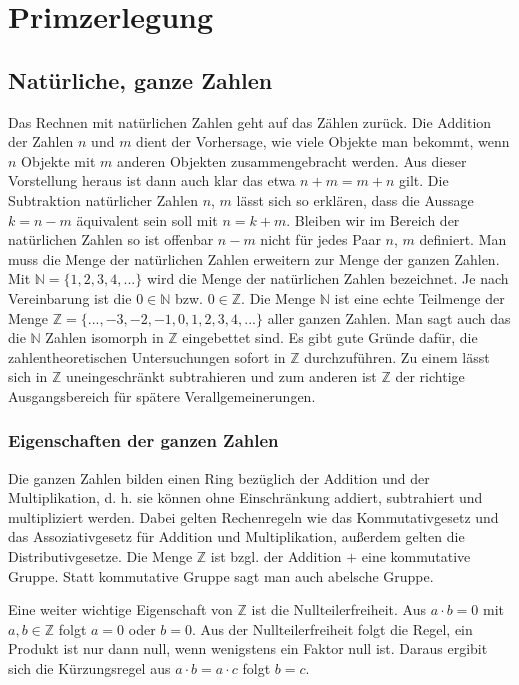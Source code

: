 \documentclass[10pt, bigheadings]{scrartcl}
\begin{document}
\newpage
\section{Primzerlegung}
\subsection{Natürliche, ganze Zahlen}
Das Rechnen mit natürlichen Zahlen geht auf das Zählen zurück. Die Addition
der Zahlen $n$ und $m$ dient der Vorhersage, wie viele Objekte man bekommt,
wenn $n$ Objekte mit $m$ anderen Objekten zusammengebracht werden. Aus
dieser Vorstellung heraus ist dann auch klar das etwa $n + m = m + n$ gilt.
Die Subtraktion natürlicher Zahlen $n$, $m$ lässt sich so erklären, dass
die Aussage $k = n - m$ äquivalent sein soll mit $n = k + m$. Bleiben wir
im Bereich der natürlichen Zahlen so ist offenbar $n-m$ nicht für jedes
Paar $n$, $m$ definiert. Man muss die Menge der natürlichen Zahlen
erweitern zur Menge der ganzen Zahlen. Mit
${\mathbb N}=\{1, 2, 3, 4, ...\}$ wird die Menge der natürlichen Zahlen
bezeichnet. Je nach Vereinbarung ist die $0 \in {\mathbb N}$ bzw.
$0 \in {\mathbb Z}$. Die Menge ${\mathbb N}$ ist eine echte Teilmenge der
Menge ${\mathbb Z}=\{..., -3, -2, -1, 0, 1, 2, 3, 4, ...\}$ aller ganzen
Zahlen. Man sagt auch das die ${\mathbb N}$ Zahlen isomorph in ${\mathbb Z}$
eingebettet sind. Es gibt gute Gründe dafür, die zahlentheoretischen
Untersuchungen sofort in ${\mathbb Z}$ durchzuführen. Zu einem lässt sich in
${\mathbb Z}$ uneingeschränkt subtrahieren und zum anderen ist ${\mathbb Z}$
der richtige Ausgangsbereich für spätere Verallgemeinerungen.

\subsubsection*{Eigenschaften der ganzen Zahlen}
Die ganzen Zahlen bilden einen Ring bezüglich der Addition und der
Multiplikation, d. h. sie können ohne Einschränkung addiert, subtrahiert
und multipliziert werden. Dabei gelten Rechenregeln wie das Kommutativgesetz
und das Assoziativgesetz für Addition und Multiplikation, außerdem gelten
die Distributivgesetze. Die Menge ${\mathbb Z}$ ist bzgl. der Addition
$+$ eine kommutative Gruppe. Statt kommutative Gruppe sagt man auch
abelsche Gruppe.

Eine weiter wichtige Eigenschaft von ${\mathbb Z}$ ist die
Nullteilerfreiheit. Aus $a\cdot b =  0$ mit $a, b \in {\mathbb Z}$
folgt $a = 0$ oder $b = 0$. Aus der Nullteilerfreiheit folgt die
Regel, ein Produkt ist nur dann null, wenn wenigstens
ein Faktor null ist. Daraus ergibit sich die Kürzungsregel aus
$a\cdot b = a\cdot c$ folgt $b = c$.
\end{document}
